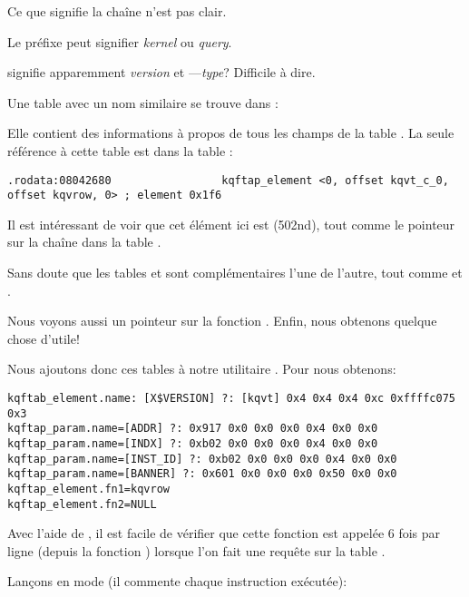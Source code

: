 Ce que signifie la chaîne  n'est pas clair. 

Le préfixe  peut signifier \emph{kernel} ou \emph{query}.

 signifie apparemment \emph{version} et ---\emph{type}?
Difficile à dire.

Une table avec un nom similaire se trouve dans :



Elle contient des informations à propos de tous les champs de la table .
La seule référence à cette table est dans la table :

\begin{lstlisting}[caption=kqf.o]
.rodata:08042680                 kqftap_element <0, offset kqvt_c_0, offset kqvrow, 0> ; element 0x1f6
\end{lstlisting}

Il est intéressant de voir que cet élément ici est  (502nd), tout comme
le pointeur sur la chaîne  dans la table .

Sans doute que les tables  et  sont complémentaires l'une de
l'autre, tout comme  et .

Nous voyons aussi un pointeur sur la fonction . Enfin, nous obtenons
quelque chose d'utile!

Nous ajoutons donc ces tables à notre utilitaire \oracletables. Pour 
nous obtenons:

\begin{lstlisting}[caption=Résultat de \OracleTablesName]
kqftab_element.name: [X$VERSION] ?: [kqvt] 0x4 0x4 0x4 0xc 0xffffc075 0x3
kqftap_param.name=[ADDR] ?: 0x917 0x0 0x0 0x0 0x4 0x0 0x0
kqftap_param.name=[INDX] ?: 0xb02 0x0 0x0 0x0 0x4 0x0 0x0
kqftap_param.name=[INST_ID] ?: 0xb02 0x0 0x0 0x0 0x4 0x0 0x0
kqftap_param.name=[BANNER] ?: 0x601 0x0 0x0 0x0 0x50 0x0 0x0
kqftap_element.fn1=kqvrow
kqftap_element.fn2=NULL
\end{lstlisting}

Avec l'aide de \tracer, il est facile de vérifier que cette fonction est appelée
6 fois par ligne (depuis la fonction ) lorsque l'on fait une requête
sur la table .

Lançons \tracer en mode  (il commente chaque instruction exécutée):

